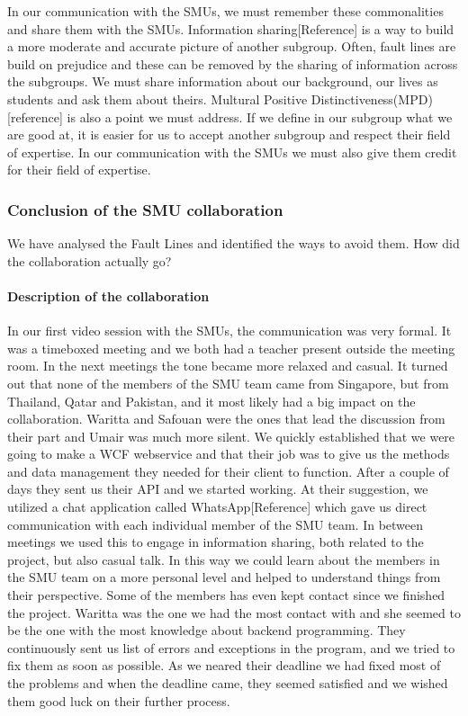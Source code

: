 \documentclass[a4paper,11pt,report]{article}
\begin{document}
In our communication with the SMUs, we must remember these commonalities and share them with the SMUs. Information sharing[Reference] is a way to build a more moderate and accurate picture of another subgroup. Often, fault lines are build on prejudice and these can be removed by the sharing of information across the subgroups. We must share information about our background, our lives as students and ask them about theirs. Multural Positive Distinctiveness(MPD)[reference] is also a point we must address. If we define in our subgroup what we are good at, it is easier for us to accept another subgroup and respect their field of expertise. In our communication with the SMUs we must also give them credit for their field of expertise. \\

\subsubsection{Conclusion of the SMU collaboration}

We have analysed the Fault Lines and identified the ways to avoid them. How did the collaboration actually go? \\

\paragraph{Description of the collaboration }
In our first video session with the SMUs, the communication was very formal. It was a timeboxed meeting and we both had a teacher present outside the meeting room. In the next meetings the tone became more relaxed and casual. It turned out that none of the members of the SMU team came from Singapore, but from Thailand, Qatar and Pakistan, and it most likely had a big impact on the collaboration. Waritta and Safouan were the ones that lead the discussion from their part and Umair was much more silent. We quickly established that we were going to make a WCF webservice and that their job was to give us the methods and data management they needed for their client to function. After a couple of days they sent us their API and we started working. At their suggestion, we utilized a chat application called WhatsApp[Reference] which gave us direct communication with each individual member of the SMU team. In between meetings we used this to engage in information sharing, both related to the project, but also casual talk. In this way we could learn about the members in the SMU team on a more personal level and helped to understand things from their perspective. Some of the members has even kept contact since we finished the project. Waritta was the one we had the most contact with and she seemed to be the one with the most knowledge about backend programming. They continuously sent us list of errors and exceptions in the program, and we tried to fix them as soon as possible. As we neared their deadline we had fixed most of the problems and when the deadline came, they seemed satisfied and we wished them good luck on their further process. \\
\end{document}
